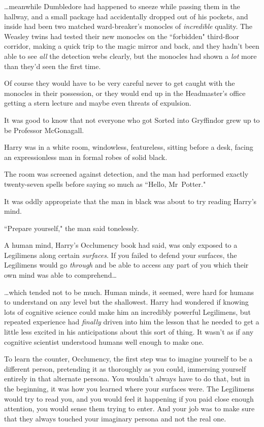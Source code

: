 {\ldots}meanwhile Dumbledore had happened to sneeze while passing them in the hallway, and a small package had accidentally dropped out of his pockets, and inside had been two matched ward-breaker's monocles of \emph{incredible} quality. The Weasley twins had tested their new monocles on the ``forbidden" third-floor corridor, making a quick trip to the magic mirror and back, and they hadn't been able to see \emph{all} the detection webs clearly, but the monocles had shown a \emph{lot} more than they'd seen the first time.

Of course they would have to be very careful never to get caught with the monocles in their possession, or they would end up in the Headmaster's office getting a stern lecture and maybe even threats of expulsion.

It was good to know that not everyone who got Sorted into Gryffindor grew up to be Professor McGonagall.

\later

Harry was in a white room, windowless, featureless, sitting before a desk, facing an expressionless man in formal robes of solid black.

The room was screened against detection, and the man had performed exactly twenty-seven spells before saying so much as ``Hello, Mr~Potter."

It was oddly appropriate that the man in black was about to try reading Harry's mind.

``Prepare yourself," the man said tonelessly.

A human mind, Harry's Occlumency book had said, was only exposed to a Legilimens along certain \emph{surfaces}. If you failed to defend your surfaces, the Legilimens would go \emph{through} and be able to access any part of you which their own mind was able to comprehend{\ldots}

{\ldots}which tended not to be much. Human minds, it seemed, were hard for humans to understand on any level but the shallowest. Harry had wondered if knowing lots of cognitive science could make him an incredibly powerful Legilimens, but repeated experience had \emph{finally} driven into him the lesson that he needed to get a little less excited in his anticipations about this sort of thing. It wasn't as if any cognitive scientist understood humans well enough to make one.

To learn the counter, Occlumency, the first step was to imagine yourself to be a different person, pretending it as thoroughly as you could, immersing yourself entirely in that alternate persona. You wouldn't always have to do that, but in the beginning, it was how you learned where your surfaces were. The Legilimens would try to read you, and you would feel it happening if you paid close enough attention, you would sense them trying to enter. And your job was to make sure that they always touched your imaginary persona and not the real one.

